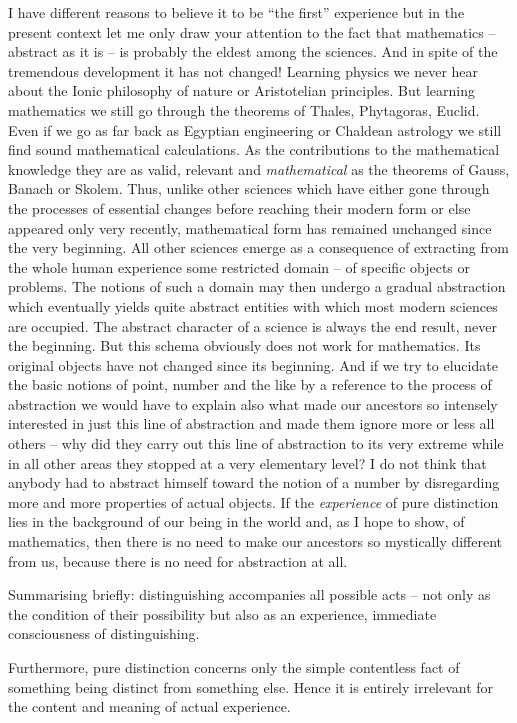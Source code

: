 I have different reasons to believe it to be ``the first'' experience but in the present context let me only draw your attention to the fact that mathematics -- abstract as it is -- is probably the eldest among the sciences. And in spite of the tremendous development it has not changed! Learning physics we never hear about the Ionic philosophy of nature or Aristotelian principles. But learning mathematics we still go through the theorems of Thales, Phytagoras, Euclid. 
Even if we go as far back as Egyptian engineering or Chaldean astrology we still find sound mathematical calculations. As the contributions to the mathematical knowledge they are as valid, relevant and {\em mathematical} as the theorems of Gauss, Banach or Skolem. Thus, unlike other sciences which have either gone through the processes of essential changes before reaching their modern form or else appeared only very recently, mathematical form has remained unchanged since the very beginning. All other sciences emerge as a consequence of extracting from the whole human experience some restricted domain -- of specific objects or problems. The notions of such a domain may then undergo a gradual abstraction which eventually yields quite abstract entities with which most modern sciences are occupied. The abstract character of a science is always the end result, never the beginning. 
But this schema obviously does not work for mathematics. Its original objects have not 
changed since its beginning. And if we try to elucidate the basic notions of point, number and the like by a reference to the process of abstraction we would have to explain also what made our ancestors so intensely interested in just this line of abstraction and made them ignore more or less all others -- why did they carry out this line of abstraction to its very extreme while in all other areas they stopped at a very elementary level? I do not think that anybody had to abstract himself toward the notion of a number by disregarding more and more properties of actual objects. 
If the {\em experience} of pure distinction lies in the background of our being in the world and, as I hope to show, of mathematics, then there is no need to
 make our ancestors so mystically different from us, because there is no need for abstraction at all.

Summarising briefly: distinguishing accompanies all possible acts -- not only as the condition of their possibility but also as an experience, immediate consciousness of distinguishing.

Furthermore, pure distinction concerns only the simple contentless fact of something being distinct from something else. Hence it is entirely irrelevant for the content and meaning of actual experience.

